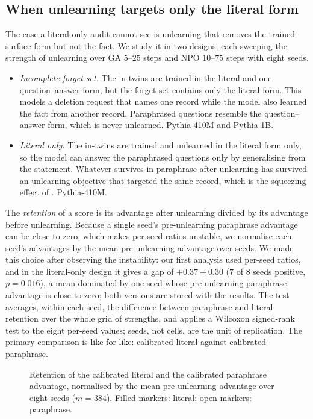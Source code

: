 \subsection{When unlearning targets only the literal form}\label{sec:exp-squeeze}

The case a literal-only audit cannot see is unlearning that removes the trained surface
form but not the fact. We study it in two designs, each sweeping the strength of
unlearning over GA $5$--$25$ steps and NPO $10$--$75$ steps with eight seeds.

\begin{itemize}
\item \emph{Incomplete forget set.} The in-twins are trained in the literal and one
question--answer form, but the forget set contains only the literal form. This models a
deletion request that names one record while the model also learned the fact from another
record. Paraphrased questions resemble the question--answer form, which is never
unlearned. Pythia-410M and Pythia-1B.
\item \emph{Literal only.} The in-twins are trained and unlearned in the literal form
only, so the model can answer the paraphrased questions only by generalising from the
statement. Whatever survives in paraphrase after unlearning has survived an unlearning
objective that targeted the same record, which is the squeezing effect of
\citet{li2026beliefs}. Pythia-410M.
\end{itemize}

The \emph{retention} of a score is its advantage after unlearning divided by its
advantage before unlearning. Because a single seed's pre-unlearning paraphrase advantage
can be close to zero, which makes per-seed ratios unstable, we normalise each seed's
advantages by the mean pre-unlearning advantage over seeds. We made this choice after
observing the instability: our first analysis used per-seed ratios, and in the literal-only
design it gives a gap of $+0.37\pm0.30$ ($7$ of $8$ seeds positive, $p=0.016$), a mean
dominated by one seed whose pre-unlearning paraphrase advantage is close to zero; both
versions are stored with the results. The test averages, within each seed, the difference between paraphrase and literal retention over
the whole grid of strengths, and applies a Wilcoxon signed-rank test \citep{wilcoxon1945}
to the eight per-seed values; seeds, not cells, are the unit of replication. The primary
comparison is like for like: calibrated literal against calibrated paraphrase.

\begin{figure}[t]
\centering

\caption{Retention of the calibrated literal and the calibrated paraphrase advantage,
normalised by the mean pre-unlearning advantage over eight seeds ($m=384$). Filled markers:
literal; open markers: paraphrase.}
\label{fig:retention}
\end{figure}

